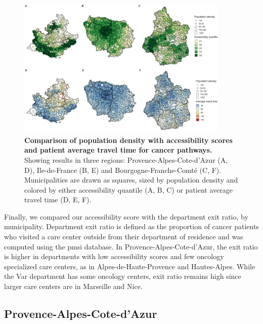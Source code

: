 \begin{figure}[H]
    \includegraphics[width=0.9\textwidth]{images/camion/fig3_accessibility_vs_density_scatter_map.png}
    \centering
    \caption{
        \textbf{Comparison of population density with accessibility scores and patient average travel time for cancer pathways.} Showing results in three regions: Provence-Alpes-Cote-d’Azur (A, D), Ile-de-France (B, E) and Bourgogne-Franche-Comté (C, F). Municipalities are drawn as squares, sized by population density and colored by either accessibility quantile (A, B, C) or patient average travel time (D, E, F).
    }
    \label{fig:accessibility-vs-density}
\end{figure}

Finally, we compared our accessibility score with the department exit ratio, by municipality. Department exit ratio is defined as the proportion of cancer patients who visited a care center outside from their department of residence and was computed using the \ac{pmsi} database. In Provence-Alpes-Cote-d'Azur, the exit ratio is higher in departments with low accessibility scores and few oncology specialized care centers, as in Alpes-de-Haute-Provence and Hautes-Alpes. While the Var department has some oncology centers, exit ratio remains high since larger care centers are in Marseille and Nice.

\subsection*{Provence-Alpes-Cote-d'Azur}

